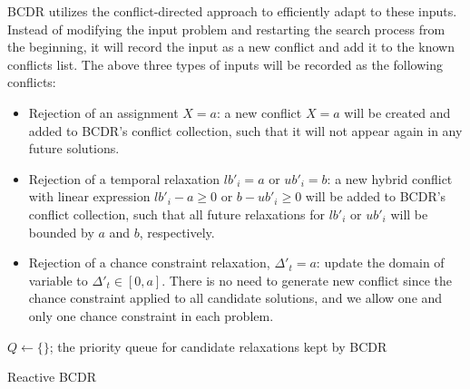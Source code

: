 \documentclass[jair,twoside,11pt,theapa]{article}
\begin{document}
BCDR utilizes the conflict-directed approach to efficiently adapt to these
inputs. Instead of modifying the input problem and restarting the search process from
the beginning, it will record the input as a new conflict and add it to the
known conflicts list. The above three types of inputs will be recorded as the
following conflicts:


\begin{itemize}
	
	\item Rejection of an assignment $X=a$: a new conflict $X=a$ will be created
	and added to BCDR's conflict collection, such that it will not appear again in
	any future solutions.
	
	
	\item Rejection of a temporal relaxation $lb'_i=a$ or $ub'_i=b$: a new
	hybrid conflict with linear expression $lb'_i-a \geq 0$ or $b-ub'_i \geq 0$ will be added to
	BCDR's conflict collection, such that all future relaxations for $lb'_i$ or
	$ub'_i$ will be bounded by $a$ and $b$, respectively.
	
	
	\item Rejection of a chance constraint relaxation, $\Delta'_t = a$: update the
	domain of variable to $\Delta'_t \in [0,a]$. There is no need to generate new
	conflict since the chance constraint applied to all candidate solutions, and we
	allow one and only one chance constraint in each problem.
	
\end{itemize}


\begin{algorithm}[h!]
	
	\SetAlgoLined
	\Indm
	\Initialize{}
	\;
	{$Q\leftarrow\{\}$; the priority queue for candidate relaxations kept by BCDR}\;
	\Indm
	\Algorithm{}
	\Indp

\caption{Reactive BCDR}
\label{alg:reactive_bcdr}
\end{algorithm}
\end{document}
